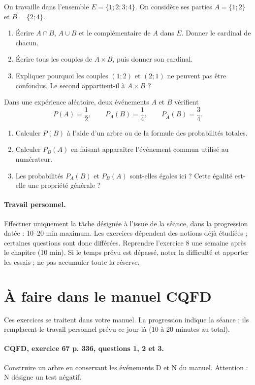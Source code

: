 On travaille dans l’ensemble $E=\{1;2;3;4\}$. On considère ses parties $A=\{1;2\}$ et $B=\{2;4\}$.
\begin{enumerate}[label=\arabic*.]
\item Écrire $A\cap B$, $A\cup B$ et le complémentaire de $A$ dans $E$. Donner le cardinal de chacun.
\item Écrire tous les couples de $A\times B$, puis donner son cardinal.
\item Expliquer pourquoi les couples $(1;2)$ et $(2;1)$ ne peuvent pas être confondus. Le second appartient-il à $A\times B$ ?
\end{enumerate}
Dans une expérience aléatoire, deux événements $A$ et $B$ vérifient\[P(A)=\dfrac12,\qquad P_A(B)=\dfrac14,\qquad P_{\overline A}(B)=\dfrac34.\]
\begin{enumerate}[label=\arabic*.]
\item Calculer $P(B)$ à l’aide d’un arbre ou de la formule des probabilités totales.
\item Calculer $P_B(A)$ en faisant apparaître l’événement commun utilisé au numérateur.
\item Les probabilités $P_A(B)$ et $P_B(A)$ sont-elles égales ici ? Cette égalité est-elle une propriété générale ?
\end{enumerate}
\paragraph{Travail personnel.} Effectuer uniquement la tâche désignée à l’issue de la séance, dans la progression datée : 10–20 min maximum. Les exercices dépendent des notions déjà étudiées ; certaines questions sont donc différées. Reprendre l’exercice 8 une semaine après le chapitre (10 min). Si le temps prévu est dépassé, noter la difficulté et apporter les essais ; ne pas accumuler toute la réserve.
\endgroup
{}\section*{À faire dans le manuel CQFD}
Ces exercices se traitent dans votre manuel. La progression indique la séance ; ils remplacent le travail personnel prévu ce jour-là (10 à 20 minutes au total).
\paragraph{CQFD, exercice 67 p. 336, questions 1, 2 et 3.}\label{C05-M1} Construire un arbre en conservant les événements D et N du manuel. Attention : N désigne un test négatif.

